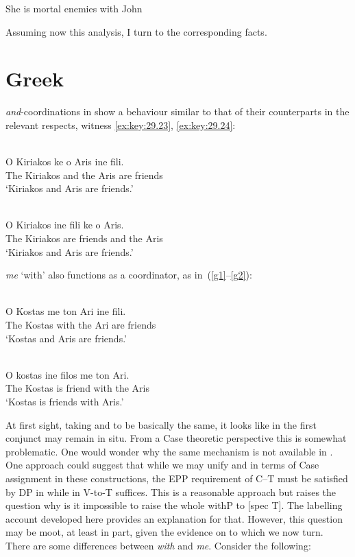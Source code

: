 \documentclass[output=paper]{langsci/langscibook}
\begin{document}
\ea\label{enem}
    She is mortal enemies with John
\z

Assuming now this analysis, I turn to the corresponding  facts.

\section{Greek} \label{greda}

\emph{and}-coordinations in  show a behaviour similar to that of
their  counterparts in the relevant respects, witness
\eqref{ex:key:29.23}, \eqref{ex:key:29.24}:

\ea\label{ex:key:29.23} \\
    \gll    O Kiriakos ke o Aris ine fili.\\
            The Kiriakos and the Aris are friends \\ \label{g5}
    \glt    \enquote*{Kiriakos and Aris are friends.}
\z

\ea\label{ex:key:29.24} \\
    \gll    \llap{*}O Kiriakos ine fili ke o Aris.\\
            The Kiriakos are friends and the Aris\\
    \glt    \enquote*{Kiriakos and Aris are friends.}
\z

 \emph{me} \enquote*{with} also functions as a coordinator, as
in~(\ref{g1}--\ref{g2}):

\ea\label{ex:key:29.25} \\
    \gll    O Kostas me ton Ari ine fili.\\
            The Kostas with the Ari are friends\\ \label{g1}
    \glt    \enquote*{Kostas and Aris are friends.}
\z

\ea\label{ex:key:29.26} \\
    \gll    O kostas ine filos me ton Ari.\\
            The Kostas is friend with the Aris\\ \label{g2}
    \glt    \enquote*{Kostas is friends with Aris.}
\z

At first sight, taking  and  to be basically the same,
it looks like in  the first conjunct may remain in situ. From
a Case theoretic perspective this is somewhat problematic. One would wonder why
the same mechanism is not available in . One approach could
suggest that while we may unify  and  in terms of Case
assignment in these constructions, the \gls{EPP} requirement of C--T must be satisfied by DP
 in  while in  V-to-T suffices. This is a
reasonable approach but raises the question why is it impossible to raise the
whole withP to [spec T]. The labelling account developed here
provides an explanation for that. However, this question may be moot, at least
in part, given the evidence on  to which we now turn. There are
some differences between \emph{with} and \emph{me}. Consider the following:
\end{document}
